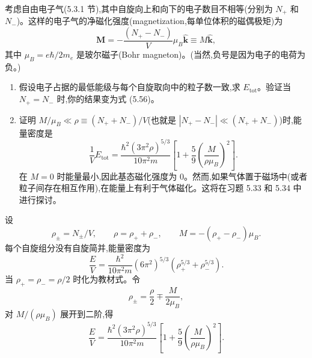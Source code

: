 \begin{question}
考虑自由电子气(5.3.1 节),其中自旋向上和向下的电子数目不相等(分别为 $N_+$ 和 $N_-$)。这样的电子气的净磁化强度(magnetization,每单位体积的磁偶极矩)为
\[
\mathbf M=-\frac{(N_+-N_-)}{V}\mu_B\hat{\mathbf k}\equiv M\hat{\mathbf k},
\]
其中 $\mu_B=e\hbar/2m_e$ 是玻尔磁子(Bohr magneton)。(当然,负号是因为电子的电荷为负。)
\begin{enumerate}
\item 假设电子占据的最低能级与每个自旋取向中的粒子数一致,求 $E_{\mathrm{tot}}$。验证当 $N_+=N_-$ 时,你的结果变为式 (5.56)。
\item 证明 $M/\mu_B\ll\rho\equiv(N_++N_-)/V$(也就是 $|N_+-N_-|\ll(N_++N_-)$)时,能量密度是
\[
\frac{1}{V}E_{\mathrm{tot}}=\frac{\hbar^2(3\pi^2\rho)^{5/3}}{10\pi^2m}
\left[1+\frac{5}{9}\left(\frac{M}{\rho\mu_B}\right)^2\right].
\]
在 $M=0$ 时能量最小,因此基态磁化强度为 0。然而,如果气体置于磁场中(或者粒子间存在相互作用),在能量上有利于气体磁化。这将在习题 5.33 和 5.34 中进行探讨。
\end{enumerate}

\par\smallskip
{}

\begin{solution}

设
\[
\rho_\pm=N_\pm/V,
\qquad \rho=\rho_++\rho_-,
\qquad M=-(\rho_+-\rho_-)\mu_B.
\]
每个自旋组分没有自旋简并,能量密度为
\[
\frac{E}{V}=\frac{\hbar^2}{10\pi^2m}(6\pi^2)^{5/3}
(\rho_+^{5/3}+\rho_-^{5/3}).
\]
当 $\rho_+=\rho_-=\rho/2$ 时化为教材式。令
\[
\rho_\pm=\frac\rho2\mp\frac{M}{2\mu_B},
\]
对 $M/(\rho\mu_B)$ 展开到二阶,得
\[
\frac{E}{V}=\frac{\hbar^2(3\pi^2\rho)^{5/3}}{10\pi^2m}
\left[1+\frac59\left(\frac{M}{\rho\mu_B}\right)^2\right].
\]

\end{solution}
\end{question}

